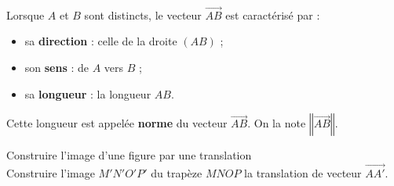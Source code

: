 \begin{Propriété}$ $\\
\vspace{-0.5cm}
\begin{minipage}[c]{0.7\linewidth}
Lorsque $A$ et $B$ sont distincts, le vecteur $\overrightarrow{AB}$ est caractérisé par : 
\begin{itemize}[label=\textcolor{Couleur2}{$\bullet$}]
\item sa {\bf{direction}} : celle de la droite $(AB)$ ;
\item son {\bf{sens}} : de $A$ vers $B$ ; 
\item sa {\bf{longueur}} : la longueur $AB$.
\end{itemize}

Cette longueur est appelée {\bf{norme}} du vecteur $\overrightarrow{AB}$. On la note $\left\Vert\overrightarrow{AB}\right\Vert$.

\end{minipage} \hfill
\begin{minipage}[c]{0.2\linewidth}
\end{minipage}


\end{Propriété}

\vspace{0.5cm}

\begin{Méthode}Construire l'image d'une figure par une translation\\
Construire l'image $M'N'O'P'$ du trapèze $MNOP$ la translation de vecteur $\overrightarrow{AA'}$.

\begin{center}
\end{center}

\end{Méthode}

